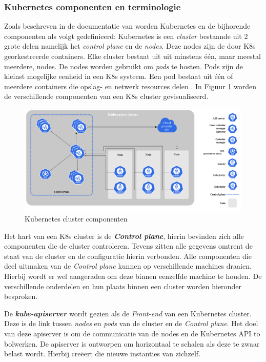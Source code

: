\subsubsection{Kubernetes componenten en terminologie}
Zoals beschreven in de documentatie van \textcite{Pedersen2021, RedHat2021a} worden Kubernetes en de bijhorende componenten als volgt gedefinieerd: Kubernetes is een \textit{cluster} bestaande uit 2 grote delen namelijk het \textit{control plane} en de \textit{nodes}. Deze nodes zijn de door K8s georkestreerde containers. Elke cluster bestaat uit uit minstens één, maar meestal meerdere, nodes. De nodes worden gebruikt om \textit{pods} te hosten. Pods zijn de kleinst mogelijke eenheid in een K8s systeem. Een pod bestaat uit één of meerdere containers die opslag- en netwerk resources delen \autocite{RedHat2021a}. In Figuur \ref{fig:K8sComponents} worden de verschillende componenten van een K8s cluster gevisualiseerd.

\begin{figure}[ht]
    \centering
    \includegraphics[width=\linewidth]{img/kubernetes-components.png}
    \caption{Kubernetes cluster componenten \autocite{Kubernetes2021}}
    \label{fig:K8sComponents}
\end{figure}

Het hart van een K8s cluster is de \textbf{\textit{Control plane}}, hierin bevinden zich alle componenten die de cluster controleren. Tevens zitten alle gegevens omtrent de staat van de cluster en de configuratie hierin verbonden. Alle componenten die deel uitmaken van de \textit{Control plane} kunnen op verschillende machines draaien. Hierbij wordt er wel aangeraden om deze binnen eenzelfde machine te houden. De verschillende onderdelen en hun plaats binnen een cluster worden hieronder besproken.

De \textbf{\textit{kube-apiserver}} wordt gezien als de \textit{Front-end} van een Kubernetes cluster. Deze is de link tussen \textit{nodes} en \textit{pods} van de cluster en de \textit{Control plane}. Het doel van deze apiserver is om de communicatie van de nodes en de Kubernetes API to bolwerken. De apiserver is ontworpen om horizontaal te schalen als deze te zwaar belast wordt. Hierbij creëert die nieuwe instanties van zichzelf.

